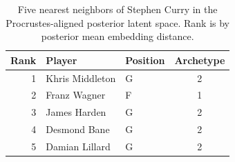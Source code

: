 \begin{table}[htbp]
  \centering\small
  \begin{tabular}{rllc}
    \toprule
    Rank & Player & Position & Archetype \\
    \midrule
    1 & Khris Middleton & G & 2 \\
    2 & Franz Wagner & F & 1 \\
    3 & James Harden & G & 2 \\
    4 & Desmond Bane & G & 2 \\
    5 & Damian Lillard & G & 2 \\
    \bottomrule
  \end{tabular}
  \caption{Five nearest neighbors of Stephen Curry in the Procrustes-aligned posterior latent space. Rank is by posterior mean embedding distance.}
  \label{tab:Stephen_Curry_neighbors}
\end{table}


